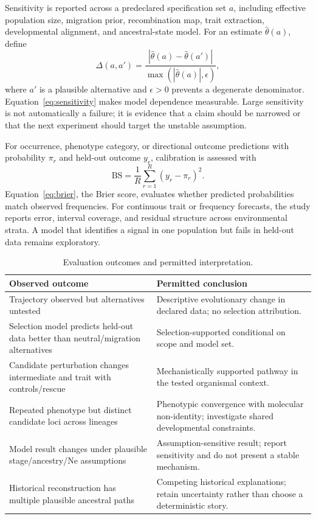 \documentclass[conference]{IEEEtran}
\begin{document}
Sensitivity is reported across a predeclared specification set $a$, including effective population size, migration prior, recombination map, trait extraction, developmental alignment, and ancestral-state model. For an estimate $\widehat{\theta}(a)$, define
\begin{equation}
\Delta(a,a')=\frac{\left|\widehat{\theta}(a)-\widehat{\theta}(a')\right|}{\max\left(\left|\widehat{\theta}(a)\right|,\epsilon\right)},
\label{eq:sensitivity}
\end{equation}
where $a'$ is a plausible alternative and $\epsilon>0$ prevents a degenerate denominator. Equation~\eqref{eq:sensitivity} makes model dependence measurable. Large sensitivity is not automatically a failure; it is evidence that a claim should be narrowed or that the next experiment should target the unstable assumption.

For occurrence, phenotype category, or directional outcome predictions with probability $\pi_r$ and held-out outcome $y_r$, calibration is assessed with
\begin{equation}
\mathrm{BS}=\frac{1}{R}\sum_{r=1}^{R}\left(y_r-\pi_r\right)^2.
\label{eq:brier}
\end{equation}
Equation~\eqref{eq:brier}, the Brier score, evaluates whether predicted probabilities match observed frequencies. For continuous trait or frequency forecasts, the study reports error, interval coverage, and residual structure across environmental strata. A model that identifies a signal in one population but fails in held-out data remains exploratory.

\begin{table}[t]
\caption{Evaluation outcomes and permitted interpretation.}
\label{tab:evaluation}
\centering
\footnotesize
\begin{tabular}{L{0.31\columnwidth} L{0.53\columnwidth}}
\toprule
\textbf{Observed outcome} & \textbf{Permitted conclusion}\\
\midrule
Trajectory observed but alternatives untested & Descriptive evolutionary change in declared data; no selection attribution.\\
Selection model predicts held-out data better than neutral/migration alternatives & Selection-supported conditional on scope and model set.\\
Candidate perturbation changes intermediate and trait with controls/rescue & Mechanistically supported pathway in the tested organismal context.\\
Repeated phenotype but distinct candidate loci across lineages & Phenotypic convergence with molecular non-identity; investigate shared developmental constraints.\\
Model result changes under plausible stage/ancestry/Ne assumptions & Assumption-sensitive result; report sensitivity and do not present a stable mechanism.\\
Historical reconstruction has multiple plausible ancestral paths & Competing historical explanations; retain uncertainty rather than choose a deterministic story.\\
\bottomrule
\end{tabular}
\end{table}
\end{document}
